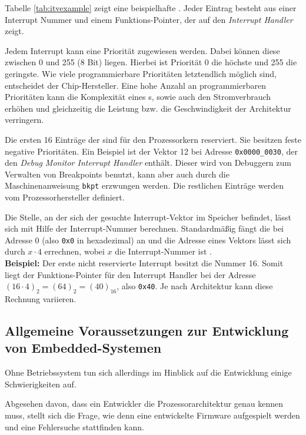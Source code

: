    Tabelle \ref{tab:itvexample} zeigt eine beispielhafte . Jeder Eintrag besteht aus einer Interrupt Nummer und
    einem Funktions-Pointer, der auf den \textit{Interrupt Handler} zeigt.

    Jedem Interrupt kann eine Priorität zugewiesen werden. Dabei können diese zwischen 0 und 255 (8 Bit) liegen.
    Hierbei ist Priorität 0 die höchste und 255 die geringste. Wie viele programmierbare Prioritäten letztendlich
    möglich sind, entscheidet der Chip-Hersteller. Eine hohe Anzahl an programmierbaren Prioritäten kann die Komplexität
    eines s, sowie auch den Stromverbrauch erhöhen und gleichzeitig die Leistung bzw. die Geschwindigkeit der
    Architektur verringern\citep[vgl.~Kap.~7.4]{Yiu2013}.

    Die ersten 16 Einträge der  sind für den Prozessorkern reserviert. Sie besitzen feste negative Prioritäten.
    Ein Beispiel ist der Vektor 12 bei Adresse \texttt{0x0000\_0030}, der den \textit{Debug Monitor Interrupt Handler} enthält.
    Dieser wird von Debuggern zum Verwalten von Breakpoints benutzt, kann aber auch durch die Maschinenanweisung
    \texttt{bkpt} erzwungen werden\citep[vgl.~Kap.~2.8]{Asche2017}.
    Die restlichen Einträge werden vom Prozessorhersteller definiert.

    Die Stelle, an der sich der gesuchte Interrupt-Vektor im Speicher befindet, lässt sich mit Hilfe der
    Interrupt-Nummer berechnen. Standardmäßig fängt die  bei Adresse 0 (also \texttt{0x0} in hexadezimal) an und die
    Adresse eines Vektors lässt sich durch $x \cdot 4$ errechnen, wobei $x$ die Interrupt-Nummer ist
    \citep[vgl.~Kap.~7.5]{Yiu2013}.\\
    \textbf{Beispiel:} Der erste nicht reservierte Interrupt besitzt die Nummer 16. Somit liegt der Funktions-Pointer
    für den Interrupt Handler bei der Adresse $(16 \cdot 4)_2 = (64)_2 = (40)_{16}$, also \texttt{0x40}. Je nach
    Architektur kann diese Rechnung variieren.

	\subsection{Allgemeine Voraussetzungen zur Entwicklung von Embedded\hyp{}Systemen}
	\label{sec:requirements}
	Ohne Betriebssystem tun sich allerdings im Hinblick auf die Entwicklung einige Schwierigkeiten auf.

    Abgesehen davon, dass ein Entwickler die Prozessorarchitektur genau kennen muss, stellt sich die Frage, wie denn eine
    entwickelte Firmware aufgespielt werden und eine Fehlersuche stattfinden kann.

